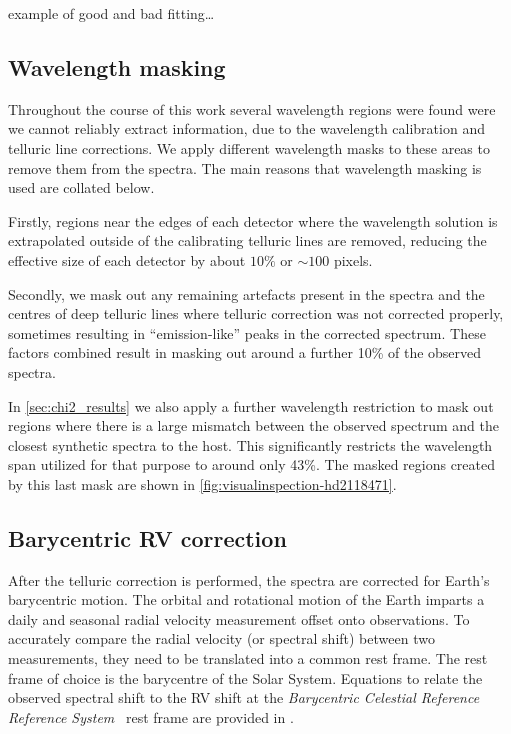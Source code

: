 
 example of good and bad fitting\ldots




\subsection{Wavelength masking}
Throughout the course of this work several wavelength regions were found were we cannot reliably extract information, due to the wavelength calibration and telluric line corrections.
We apply different wavelength masks to these areas to remove them from the spectra.
The main reasons that wavelength masking is used are collated below.

Firstly, regions near the edges of each detector where the wavelength solution is extrapolated outside of the calibrating telluric lines are removed, reducing the effective size of each detector by about \(10\%\) or \(\sim100\) pixels.

Secondly, we mask out any remaining artefacts present in the spectra and the centres of deep telluric lines where telluric correction was not corrected properly, sometimes resulting in ``emission-like'' peaks in the corrected spectrum.
These factors combined result in masking out around a further 10\% of the observed spectra.

In \cref{sec:chi2_results} we also apply a further wavelength restriction to mask out regions where there is a large mismatch between the observed spectrum and the closest synthetic spectra to the host.
This significantly restricts the wavelength span utilized for that purpose to around only 43\%.
The masked regions created by this last mask are shown in \cref{fig:visualinspection-hd2118471}.





\subsection{Barycentric RV correction}
\label{{subsec:barycentriccorrection}}
After the telluric correction is performed, the spectra are corrected for Earth's barycentric motion. The orbital and rotational motion of the Earth imparts a daily and seasonal radial velocity measurement offset onto observations. To accurately compare the radial velocity (or spectral shift) between two measurements, they need to be translated into a common rest frame. The rest frame of choice is the barycentre of the Solar System.  Equations to relate the observed spectral shift to the RV shift at the \textit{Barycentric Celestial Reference Reference System}~\citep{rickman_transactions_2001} rest frame are provided in \citep{lindegren_fundamental_2003}.

